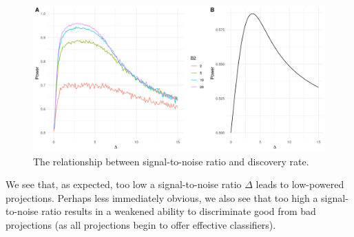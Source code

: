 \documentclass[12pt]{article}
\begin{document}
\begin{figure}[htbp]
    \centering
    \includegraphics[width=5in]{../results/figures/ChangingDelta.png}
    \caption{The relationship between signal-to-noise ratio and discovery rate.\label{fig:ChangingDelta}}
\end{figure}

We see that, as expected, too low a signal-to-noise ratio $\Delta$ leads to low-powered projections. Perhaps less immediately obvious, we also see that too high a signal-to-noise ratio results in a weakened ability to discriminate good from bad projections (as all projections begin to offer effective classifiers).  
\end{document}
